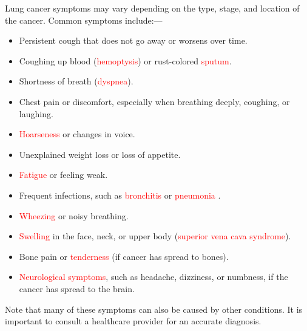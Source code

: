 Lung cancer symptoms may vary depending on the type, stage, and location of the cancer. Common symptoms include:---

\begin{itemize}
    \item Persistent cough that does not go away or worsens over time.
    \item Coughing up blood (\textcolor{red}{hemoptysis}) or rust-colored \textcolor{red}{sputum}.
    \item Shortness of breath (\textcolor{red}{dyspnea}).
    \item Chest pain or discomfort, especially when breathing deeply, coughing, or laughing.
    \item \textcolor{red}{Hoarseness} or changes in voice.
    \item Unexplained weight loss or loss of appetite.
    \item \textcolor{red}{Fatigue} or feeling weak.
    \item Frequent infections, such as \textcolor{red}{bronchitis} or \textcolor{red}{pneumonia} .
    \item \textcolor{red}{Wheezing} or noisy breathing.
    \item \textcolor{red}{Swelling} in the face, neck, or upper body (\textcolor{red}{superior vena cava syndrome}).
    \item Bone pain or \textcolor{red}{tenderness} (if cancer has spread to bones).
    \item \textcolor{red}{Neurological symptoms}, such as headache, dizziness, or numbness, if the cancer has spread to the brain.
\end{itemize}

Note that many of these symptoms can also be caused by other conditions. It is important to consult a healthcare provider for an accurate diagnosis.
\newpage